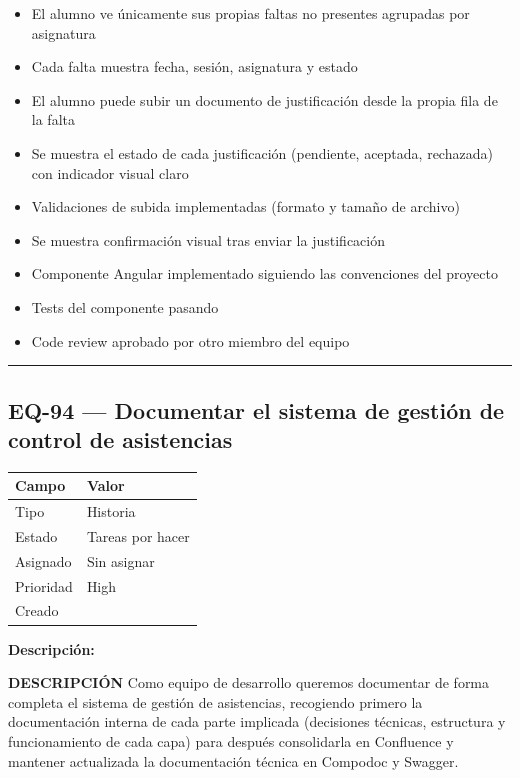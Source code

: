 \documentclass[
  spanish,
  11pt,
]{report}
\newcounter{none} %
\providecommand{\tightlist}{%
  \setlength{\itemsep}{0pt}\setlength{\parskip}{0pt}}
\begin{document}
\begin{itemize}
\tightlist
\item
  El alumno ve únicamente sus propias faltas no presentes agrupadas por
  asignatura
\item
  Cada falta muestra fecha, sesión, asignatura y estado
\item
  El alumno puede subir un documento de justificación desde la propia
  fila de la falta
\item
  Se muestra el estado de cada justificación (pendiente, aceptada,
  rechazada) con indicador visual claro
\item
  Validaciones de subida implementadas (formato y tamaño de archivo)
\item
  Se muestra confirmación visual tras enviar la justificación
\item
  Componente Angular implementado siguiendo las convenciones del
  proyecto
\item
  Tests del componente pasando
\item
  Code review aprobado por otro miembro del equipo
\end{itemize}

\begin{center}\rule{0.5\linewidth}{0.5pt}\end{center}

\subsection{EQ-94 --- Documentar el sistema de gestión de control de
asistencias}\label{eq-94-documentar-el-sistema-de-gestiuxf3n-de-control-de-asistencias}

{\def\LTcaptype{none} %
\begin{longtable}[]{@{}ll@{}}
\toprule\noalign{}
Campo & Valor \\
\midrule\noalign{}
\endhead
\bottomrule\noalign{}
\endlastfoot
Tipo & Historia \\
Estado & Tareas por hacer \\
Asignado & Sin asignar \\
Prioridad & High \\
Creado & \\
\end{longtable}
}

\textbf{Descripción:}

\textbf{DESCRIPCIÓN} Como equipo de desarrollo queremos documentar de
forma completa el sistema de gestión de asistencias, recogiendo primero
la documentación interna de cada parte implicada (decisiones técnicas,
estructura y funcionamiento de cada capa) para después consolidarla en
Confluence y mantener actualizada la documentación técnica en Compodoc y
Swagger.
\end{document}

